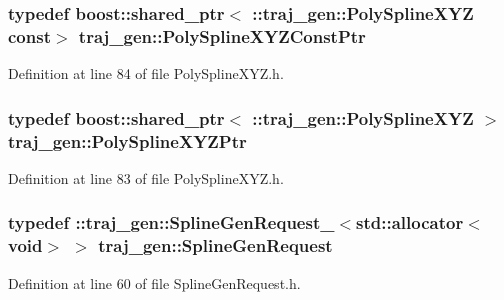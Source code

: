 \subsubsection[{\texorpdfstring{Poly\+Spline\+X\+Y\+Z\+Const\+Ptr}{PolySplineXYZConstPtr}}]{\setlength{\rightskip}{0pt plus 5cm}typedef boost\+::shared\+\_\+ptr$<$ \+::{\bf traj\+\_\+gen\+::\+Poly\+Spline\+X\+YZ} const$>$ {\bf traj\+\_\+gen\+::\+Poly\+Spline\+X\+Y\+Z\+Const\+Ptr}}\hypertarget{namespacetraj__gen_a9638044f096a0c6553bcf3972c4e2c6e}{}\label{namespacetraj__gen_a9638044f096a0c6553bcf3972c4e2c6e}


Definition at line 84 of file Poly\+Spline\+X\+Y\+Z.\+h.

\subsubsection[{\texorpdfstring{Poly\+Spline\+X\+Y\+Z\+Ptr}{PolySplineXYZPtr}}]{\setlength{\rightskip}{0pt plus 5cm}typedef boost\+::shared\+\_\+ptr$<$ \+::{\bf traj\+\_\+gen\+::\+Poly\+Spline\+X\+YZ} $>$ {\bf traj\+\_\+gen\+::\+Poly\+Spline\+X\+Y\+Z\+Ptr}}\hypertarget{namespacetraj__gen_abe722a2745301b8f42f798c46825620a}{}\label{namespacetraj__gen_abe722a2745301b8f42f798c46825620a}


Definition at line 83 of file Poly\+Spline\+X\+Y\+Z.\+h.

\subsubsection[{\texorpdfstring{Spline\+Gen\+Request}{SplineGenRequest}}]{\setlength{\rightskip}{0pt plus 5cm}typedef \+::{\bf traj\+\_\+gen\+::\+Spline\+Gen\+Request\+\_\+}$<$std\+::allocator$<$void$>$ $>$ {\bf traj\+\_\+gen\+::\+Spline\+Gen\+Request}}\hypertarget{namespacetraj__gen_a61c65203f503c18d4b3cb68b9ee74a74}{}\label{namespacetraj__gen_a61c65203f503c18d4b3cb68b9ee74a74}


Definition at line 60 of file Spline\+Gen\+Request.\+h.

